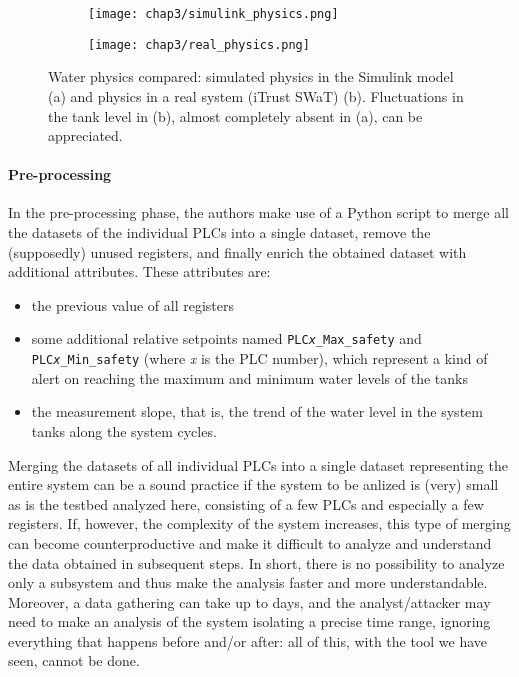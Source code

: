 \pagebreak
\begin{figure}[ht]
	\centering
	\begin{subfigure}{0.9\textwidth}
		\texttt{[image: chap3/simulink\_physics.png]}
		\caption{}
		\label{subfig:simulink_physics}
	\end{subfigure}
	\hfill
	\begin{subfigure}{0.9\textwidth}
		\texttt{[image: chap3/real\_physics.png]}
		\caption{}
		\label{subfig:real_physics}
	\end{subfigure}
	\caption{Water physics compared: simulated physics in the Simulink model (a) and physics in a real system (iTrust SWaT) (b). Fluctuations in the tank level in (b), almost completely absent in (a), can be appreciated.}
	\label{fig:testbed_physics}
\end{figure}

\paragraph{Pre-processing}
In the pre-processing phase, the authors make use of a Python script to merge all the datasets of the individual PLCs into a single dataset, remove the (supposedly) unused registers, and finally enrich the obtained dataset with additional attributes. These attributes are:

\begin{itemize}
	\item the previous value of all registers
	
	\item some additional relative setpoints named \texttt{PLC\textit{x}\_Max\_safety} and\\ 
	\texttt{PLC\textit{x}\_Min\_safety} (where \textit{x} is the PLC number), which represent a kind of alert on reaching the maximum and minimum water levels of the tanks
	
	\item the measurement slope, that is, the trend of the water level in the system tanks along the system cycles.	
\end{itemize}

Merging the datasets of all individual PLCs into a single dataset representing the entire system can be a sound practice if the system to be anlized is (very) small as is the testbed analyzed here, consisting of a few PLCs and especially a few registers. If, however, the complexity of the system increases, this type of merging can become counterproductive and make it difficult to analyze and understand the data obtained in subsequent steps.\newline 
In short, there is no possibility to analyze only a subsystem and thus make the analysis faster and more understandable. Moreover, a data gathering can take up to days, and the analyst/attacker may need to make an analysis of the system isolating a precise time range, ignoring everything that happens before and/or after: all of this, with the tool we have seen, cannot be done.

